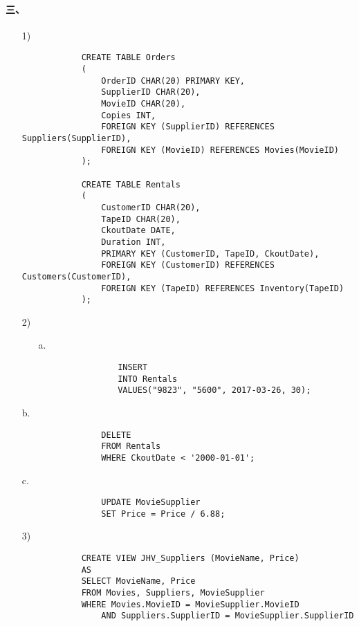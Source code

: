 \documentclass[10pt,a4paper]{article}
\begin{document}
    \paragraph{三、}
    \begin{enumerate}
        \item[1)]\begin{verbatim}
            CREATE TABLE Orders
            (
                OrderID CHAR(20) PRIMARY KEY,
                SupplierID CHAR(20), 
                MovieID CHAR(20),
                Copies INT,
                FOREIGN KEY (SupplierID) REFERENCES Suppliers(SupplierID),
                FOREIGN KEY (MovieID) REFERENCES Movies(MovieID)
            );

            CREATE TABLE Rentals
            (
                CustomerID CHAR(20),
                TapeID CHAR(20),
                CkoutDate DATE,
                Duration INT,
                PRIMARY KEY (CustomerID, TapeID, CkoutDate),
                FOREIGN KEY (CustomerID) REFERENCES Customers(CustomerID),
                FOREIGN KEY (TapeID) REFERENCES Inventory(TapeID)
            );
        \end{verbatim}
        \item[2)]\begin{enumerate}
            \item[a.]\begin{verbatim}
                INSERT
                INTO Rentals
                VALUES("9823", "5600", 2017-03-26, 30);
            \end{verbatim}
        \end{enumerate}
            \item[b.]\begin{verbatim}
                DELETE
                FROM Rentals
                WHERE CkoutDate < '2000-01-01';
            \end{verbatim}
            \item[c.]\begin{verbatim}
                UPDATE MovieSupplier
                SET Price = Price / 6.88;
            \end{verbatim}
        \item[3)]\begin{verbatim}
            CREATE VIEW JHV_Suppliers (MovieName, Price)
            AS
            SELECT MovieName, Price
            FROM Movies, Suppliers, MovieSupplier
            WHERE Movies.MovieID = MovieSupplier.MovieID
                AND Suppliers.SupplierID = MovieSupplier.SupplierID

\end{verbatim}
\end{enumerate}
\end{document}
